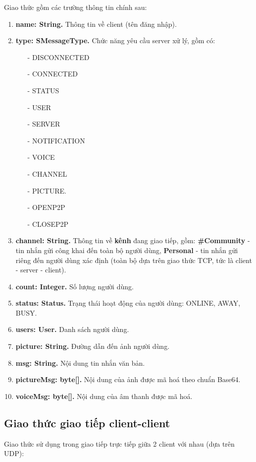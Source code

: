 \documentclass[a4paper]{article}
\begin{document}
Giao thức gồm các trường thông tin chính sau:
\begin{enumerate}
	\item {\bf name: String.} Thông tin về client (tên đăng nhập).
	\item {\bf type: SMessageType.} Chức năng yêu cầu server xử lý, gồm có: 
	\begin{itemize}
		\item[-] DISCONNECTED
		\item[-] CONNECTED 
		\item[-] STATUS
		\item[-] USER
		\item[-] SERVER
		\item[-] NOTIFICATION
		\item[-] VOICE
		\item[-] CHANNEL
		\item[-] PICTURE.
		\item[-] OPENP2P
		\item[-] CLOSEP2P
	\end{itemize}
	\item {\bf channel: String.} Thông tin về {\bf kênh} đang giao tiếp, gồm: {\bf \#Community} - tin nhắn gửi công khai đến toàn bộ người dùng, {\bf Personal} - tin nhắn gửi riêng đến người dùng xác định (toàn bộ dựa trên giao thức TCP, tức là client - server - client).
	\item {\bf count: Integer.} Số lượng người dùng.
	\item {\bf status: Status.} Trạng thái hoạt động của người dùng: ONLINE, AWAY, BUSY.
	\item {\bf users: User.} Danh sách người dùng.
	\item {\bf picture: String.} Đường dẫn đến ảnh người dùng.
	\item {\bf msg: String.} Nội dung tin nhắn văn bản.
	\item {\bf pictureMsg: byte[].} Nội dung của ảnh được mã hoá theo chuẩn Base64.
	\item {\bf voiceMsg: byte[].} Nội dung của âm thanh được mã hoá.
\end{enumerate}

 

\subsection{Giao thức giao tiếp client-client}

Giao thức sử dụng trong giao tiếp trực tiếp giữa 2 client với nhau (dựa trên UDP):
\end{document}
